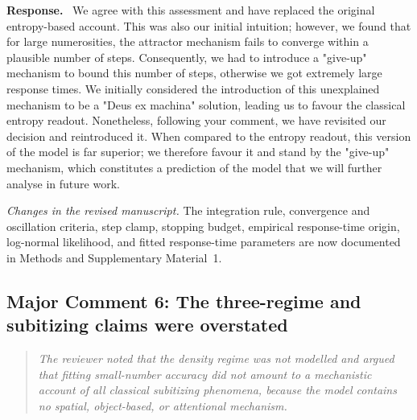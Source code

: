 \documentclass[11pt]{article}
\newenvironment{reviewercomment}{\begin{quote}\color{reviewgray}\itshape}{\end{quote}}
\newenvironment{authorresponse}{\par\noindent\textbf{\color{responseblue}Response.}\ }{\par}
\newcommand{\change}[1]{\par\noindent\textit{Changes in the revised manuscript.} #1\par}
\begin{document}
\begin{authorresponse}
We agree with this assessment and have replaced the original entropy-based account. This was also our initial intuition; however, we found that for large numerosities, the attractor mechanism fails to converge within a plausible number of steps. Consequently, we had to introduce a "give-up" mechanism to bound this number of steps, otherwise we got extremely large response times. We initially considered the introduction of this unexplained mechanism to be a "Deus ex machina" solution, leading us to favour the classical entropy readout. Nonetheless, following your comment, we have revisited our decision and reintroduced it. When compared to the entropy readout, this version of the model is far superior; we therefore favour it and stand by the "give-up" mechanism, which constitutes a prediction of the model that we will further analyse in future work.
\end{authorresponse}

\change{The integration rule, convergence and oscillation criteria, step clamp, stopping budget, empirical response-time origin, log-normal likelihood, and fitted response-time parameters are now documented in Methods and Supplementary Material~1.}

\subsection*{Major Comment 6: The three-regime and subitizing claims were overstated}

\begin{reviewercomment}
The reviewer noted that the density regime was not modelled and argued that fitting small-number accuracy did not amount to a mechanistic account of all classical subitizing phenomena, because the model contains no spatial, object-based, or attentional mechanism.
\end{reviewercomment}
\end{document}

